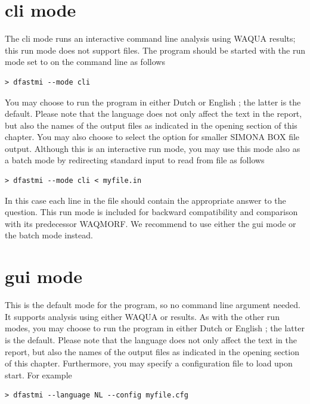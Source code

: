 \section{cli mode}

The cli mode runs an interactive command line analysis using WAQUA results; this run mode does not support \dflowfm files.
The program should be started with the run mode set to  on the command line as follows

\begin{Verbatim}
> dfastmi --mode cli
\end{Verbatim}

You may choose to run the program in either Dutch  or English ; the latter is the default.
Please note that the language does not only affect the text in the report, but also the names of the output files as indicated in the opening section of this chapter.
You may also choose to select the  option for smaller SIMONA BOX file output.
Although this is an interactive run mode, you may use this mode also as a batch mode by redirecting standard input to read from file as follows

\begin{Verbatim}
> dfastmi --mode cli < myfile.in
\end{Verbatim}

In this case each line in the file  should contain the appropriate answer to the question.
This run mode is included for backward compatibility and comparison with its predecessor WAQMORF.
We recommend to use either the gui mode or the batch mode instead.

\section{gui mode}

This is the default mode for the program, so no command line argument needed.
It supports analysis using either WAQUA or \dflowfm results.
As with the other run modes, you may choose to run the program in either Dutch  or English ; the latter is the default.
Please note that the language does not only affect the text in the report, but also the names of the output files as indicated in the opening section of this chapter.
Furthermore, you may specify a configuration file to load upon start.
For example

\begin{Verbatim}
> dfastmi --language NL --config myfile.cfg
\end{Verbatim}

